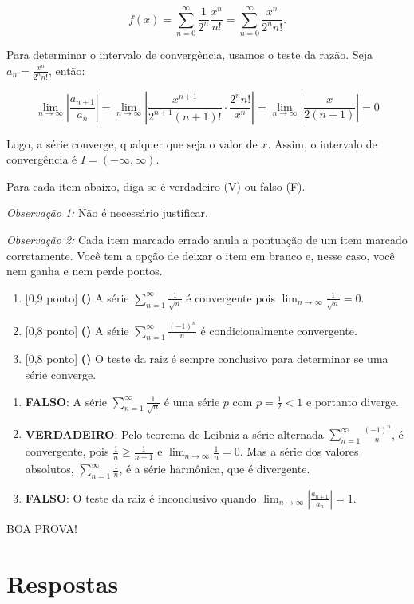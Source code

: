 \documentclass[12pt,a4paper]{article}
\begin{document}
\begin{ExerciseList}
\[
f(x) = \sum_{n=0}^{\infty} \frac{1}{2^n} \frac{x^n}{n!}
= \boxed{\sum_{n=0}^{\infty} \frac{x^n}{2^n n!}}.
\]

Para determinar o intervalo de convergência, usamos o teste da razão. Seja \( a_n = \frac{x^n}{2^n n!} \), então:

\[
\lim_{n \to \infty} \left| \frac{a_{n+1}}{a_n} \right|
= \lim_{n \to \infty} \left| \frac{x^{n+1}}{2^{n+1}(n+1)!} \cdot \frac{2^n n!}{x^n} \right|
= \lim_{n \to \infty} \left| \frac{x}{2(n+1)} \right|
= 0
\]

Logo, a série converge, qualquer que seja o valor de \( x \). Assim, o intervalo de convergência é \( \boxed{I = (-\infty, \infty)} \).


\Exercise[title={2,5}] Para cada item abaixo, diga se é verdadeiro (V) ou falso (F).

\emph{Observação 1:} Não é necessário justificar.

\emph{Observação 2:} Cada item marcado errado anula a pontuação de um item marcado corretamente. Você tem a opção de deixar o item em branco e, nesse caso, você nem ganha e nem perde pontos.

\begin{enumerate}
    \item {[0,9 ponto] \bf (\hspace{.7em})} A série \(\sum_{n=1}^{\infty} \frac{1}{\sqrt{n}}\) é convergente pois \(\lim_{n \to \infty} \frac{1}{\sqrt{n}} = 0\).
    \item {[0,8 ponto] \bf (\hspace{.7em})} A série \(\sum_{n=1}^{\infty} \frac{(-1)^n}{n}\) é condicionalmente convergente.
    \item {[0,8 ponto] \bf (\hspace{.7em})} O teste da raiz é sempre conclusivo para determinar se uma série converge.
\end{enumerate}
\Answer
\begin{enumerate}
    \item \textbf{FALSO}: A série \(\sum_{n=1}^{\infty} \frac{1}{\sqrt{n}}\) é uma série $p$ com $p = \frac{1}{2} < 1$ e portanto diverge.
    \item \textbf{VERDADEIRO}: Pelo teorema de Leibniz a série alternada \(\sum_{n=1}^{\infty} \frac{(-1)^n}{n}\), é convergente, pois $ \frac{1}{n} \geq \frac{1}{n+1}$ e $\lim_{n\to\infty} \frac{1}{n}=0$. Mas a série dos valores absolutos, \(\sum_{n=1}^{\infty} \frac{1}{n}\), é a série harmônica, que é divergente.
    \item \textbf{FALSO}: O teste da raiz é inconclusivo quando $\lim_{n\to \infty} \left|\frac{a_{n+1}}{a_n}\right| = 1$.
\end{enumerate}
\end{ExerciseList}

\vfill
\begin{center}
BOA PROVA!
\end{center}

\newpage
\restoregeometry
\section*{Respostas}
\shipoutAnswer
\end{document}
